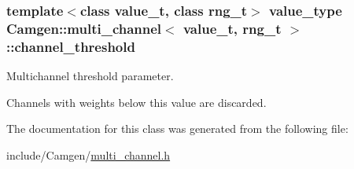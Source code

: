 \subsubsection[{channel\+\_\+threshold}]{\setlength{\rightskip}{0pt plus 5cm}template$<$class value\+\_\+t, class rng\+\_\+t$>$ value\+\_\+type {\bf Camgen\+::multi\+\_\+channel}$<$ value\+\_\+t, rng\+\_\+t $>$\+::channel\+\_\+threshold}\label{a00379_ab6dc38b4116fd836a04281052464d01a}


Multichannel threshold parameter. 

Channels with weights below this value are discarded. 

The documentation for this class was generated from the following file\+:\begin{DoxyCompactItemize}
\item 
include/\+Camgen/\hyperlink{a00698}{multi\+\_\+channel.\+h}\end{DoxyCompactItemize}
